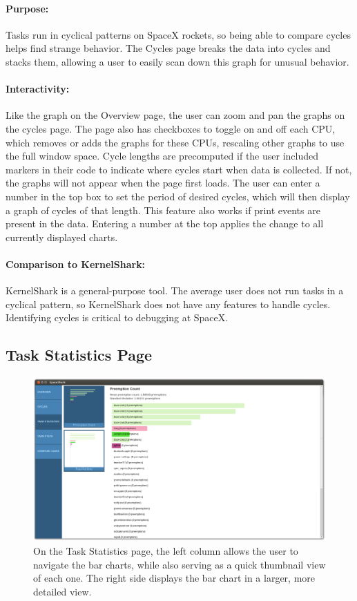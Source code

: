 \documentclass{hmcclinic}
\begin{document}
  \paragraph{Purpose:}Tasks run in cyclical patterns on SpaceX rockets, so being
  able to compare cycles helps find strange behavior. The Cycles page breaks the
  data into cycles and stacks them, allowing a user to easily scan down this
  graph for unusual behavior.

\paragraph{Interactivity:}    
    Like the graph on the Overview page, the user can zoom and pan the graphs on
    the cycles page.  The page also has checkboxes to toggle on and off each
    CPU, which removes or adds the graphs for these CPUs, rescaling other graphs
    to use the full window space. Cycle lengths are precomputed if the user
    included markers in their code to indicate where cycles start when data is
    collected.  If not, the graphs will not appear when the page first loads.
    The user can enter a number in the top box to set the period of desired
    cycles, which will then display a graph of cycles of that length. This
    feature also works  if print events are present in the data.  Entering a
    number at the top applies the change to all currently displayed charts.
        
\paragraph{Comparison to KernelShark:}
    KernelShark is a general-purpose tool. The average user does not run tasks
    in a cyclical pattern, so KernelShark does not have any features to handle
    cycles. Identifying cycles is critical to debugging at SpaceX.
    
  \subsection{Task Statistics Page} %

  \begin{figure}[H]
  \includegraphics[width=5in]{task-statistics-page.png}
  \caption{On the Task Statistics page, the left column allows the user to navigate the bar charts, while
    also serving as a quick thumbnail view of each one. The right side displays
  the bar chart in a larger, more detailed view.}
  \end{figure}
\end{document}
